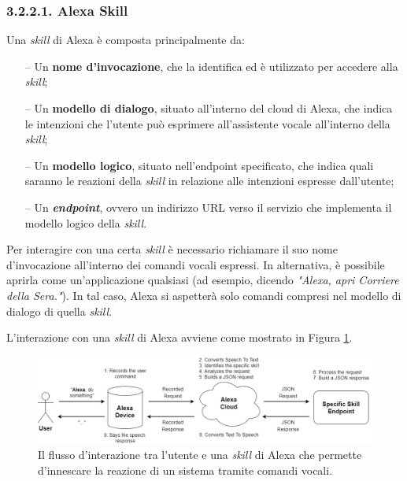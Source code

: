 \subsubsection{3.2.2.1. Alexa Skill}
\label{subsec:Sezione3.2.2.1}

Una \textit{skill} di Alexa è composta principalmente da:
\begin{itemize}
  \item[--] Un \textbf{nome d’invocazione}, che la identifica ed è utilizzato
        per accedere alla \textit{skill};
  \item[--] Un \textbf{modello di dialogo}, situato all’interno del cloud di
        Alexa, che indica le intenzioni che l’utente può esprimere
        all’assistente vocale all’interno della \textit{skill};
  \item[--] Un \textbf{modello logico}, situato nell’endpoint specificato, che
        indica quali saranno le reazioni della \textit{skill} in relazione alle
        intenzioni espresse dall’utente;
  \item[--] Un \textit{\textbf{endpoint}}, ovvero un indirizzo URL verso il
        servizio che implementa il modello logico della \textit{skill}.
\end{itemize}

Per interagire con una certa \textit{skill} è necessario richiamare il suo nome
d'invocazione all’interno dei comandi vocali espressi. In alternativa, è
possibile aprirla come un’applicazione qualsiasi (ad esempio, dicendo
\textit{"Alexa, apri Corriere della Sera."}). In tal caso, Alexa si aspetterà
solo comandi compresi nel modello di dialogo di quella \textit{skill}.

L’interazione con una \textit{skill} di Alexa avviene come mostrato in Figura
\ref{fig:figure3.5}.

\begin{figure}[!ht]
  \centering
  \includegraphics[scale=0.35]{resources/images/other/alexa-skill-flow.jpg}
  \caption{
    Il flusso d'interazione tra l'utente e una \textit{skill} di Alexa che
    permette d'innescare la reazione di un sistema tramite comandi vocali.
  }
  \label{fig:figure3.5}
\end{figure}


